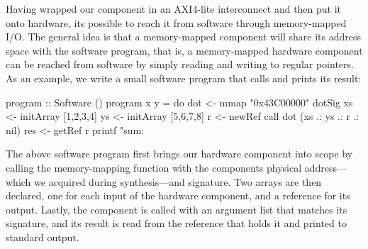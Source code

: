 \documentclass[../paper.tex]{subfiles}
\begin{document}
Having wrapped our  component in an AXI4-lite interconnect and then put it onto hardware, its possible to reach it from software through memory-mapped I/O. The general idea is that a memory-mapped component will share its address space with the software program, that is, a memory-mapped hardware component can be reached from software by simply reading and writing to regular pointers. As an example, we write a small software program that calls  and prints its result:

\begin{code}
program :: Software ()
program x y = do
  dot <- mmap "0x43C00000" dotSig
  xs  <- initArray [1,2,3,4]
  ys  <- initArray [5,6,7,8]
  r   <- newRef
  call dot (xs .: ys .: r .: nil)
  res <- getRef r
  printf "sum: %
\end{code}

The above software program first brings our  hardware component into scope by calling the memory-mapping function  with the components physical address---which we acquired during synthesis---and signature. Two arrays are then declared, one for each input of the hardware component, and a reference for its output. Lastly, the component is called with an argument list that matches its signature, and its result is read from the reference that holds it and printed to standard output.
\end{document}
